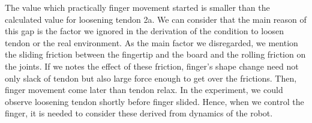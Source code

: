 \documentclass{llncs}
\begin{document}
The value which practically finger movement started is smaller than the calculated value for loosening tendon 2a.
We can consider that the main reason of this gap is the factor we ignored in the derivation of the condition to loosen tendon or the real environment.
As the main factor we disregarded, we mention the sliding friction between the fingertip and the board and the rolling friction on the joints.
If we notes the effect of these friction, 
finger's shape change need not only slack of tendon but also large force enough to get over the frictions.
Then, finger movement come later than tendon relax.
In the experiment, we could observe loosening tendon shortly before finger slided.
Hence, when we control the finger, it is needed to consider these derived from dynamics of the robot.
\end{document}
